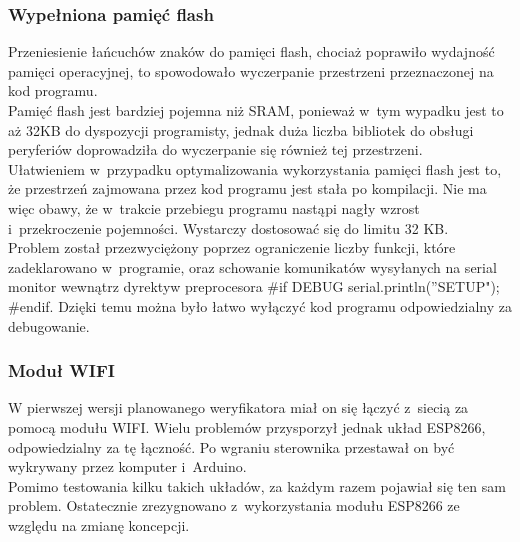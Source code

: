 \documentclass[declaration,shortabstract, mgr]{iithesis}
\begin{document}
\subsubsection{Wypełniona pamięć flash}
\indent Przeniesienie łańcuchów znaków do pamięci flash, chociaż poprawiło wydajność pamięci operacyjnej, to spowodowało wyczerpanie przestrzeni przeznaczonej na kod programu. \\
\indent Pamięć flash jest bardziej pojemna niż SRAM, ponieważ w~tym wypadku jest to aż 32KB do dyspozycji programisty, jednak duża liczba bibliotek do obsługi peryferiów doprowadziła do wyczerpanie się również tej przestrzeni. \\
\indent Ułatwieniem w~przypadku optymalizowania wykorzystania pamięci flash jest to, że przestrzeń zajmowana przez kod programu jest stała po kompilacji. Nie ma więc obawy, że w~trakcie przebiegu programu nastąpi nagły wzrost i~przekroczenie pojemności. Wystarczy dostosować się do limitu 32 KB. \\
\indent Problem został przezwyciężony poprzez ograniczenie liczby funkcji, które zadeklarowano w~programie, oraz schowanie komunikatów wysyłanych na serial monitor wewnątrz dyrektyw preprocesora \#if DEBUG serial.println(''SETUP"); \#endif. Dzięki temu można było łatwo wyłączyć kod programu odpowiedzialny za debugowanie.\\
\subsubsection{Moduł WIFI}
\indent W pierwszej wersji planowanego weryfikatora miał on się łączyć z~siecią za pomocą modułu WIFI. Wielu problemów przysporzył jednak układ ESP8266, odpowiedzialny za tę łączność. Po wgraniu sterownika przestawał on być wykrywany przez komputer i~Arduino.\\
\indent Pomimo testowania kilku takich układów, za każdym razem pojawiał się ten sam problem. Ostatecznie zrezygnowano z~wykorzystania modułu ESP8266 ze względu na zmianę koncepcji.
\end{document}
